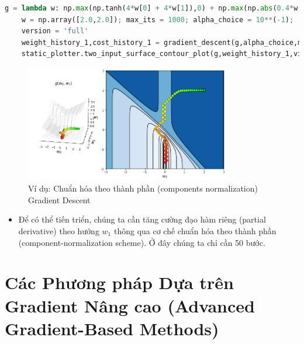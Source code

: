 \documentclass{book}
\begin{document}
\begin{lstlisting}[language=Python, caption={Đoạn mã Python của Gradient Descent chuẩn hóa theo thành phần}, label={code:components_normalized_gd}]
    g = lambda w: np.max(np.tanh(4*w[0] + 4*w[1]),0) + np.max(np.abs(0.4*w[0]),0) + 1
    w = np.array([2.0,2.0]); max_its = 1000; alpha_choice = 10**(-1);
    version = 'full'
    weight_history_1,cost_history_1 = gradient_descent(g,alpha_choice,max_its,w,version)
    static_plotter.two_input_surface_contour_plot(g,weight_history_1,view = [20,280],num_contours = 24,xmin = -3,xmax = 3,ymin = -2,ymax = 3)
\end{lstlisting}
\begin{figure}[H]
    \centering
    \includegraphics[width=0.8\textwidth]{images/components_normalized_gd.png}
    \caption{Ví dụ: Chuẩn hóa theo thành phần (components normalization) Gradient Descent}
\end{figure}
\begin{itemize}
    \item Để có thể tiến triển, chúng ta cần tăng cường đạo hàm riêng (partial derivative) theo hướng $w_1$ thông qua cơ chế chuẩn hóa theo thành phần (component-normalization scheme). Ở đây chúng ta chỉ cần 50 bước.
\end{itemize}
\section{Các Phương pháp Dựa trên Gradient Nâng cao (Advanced Gradient-Based Methods)}
\end{document}
